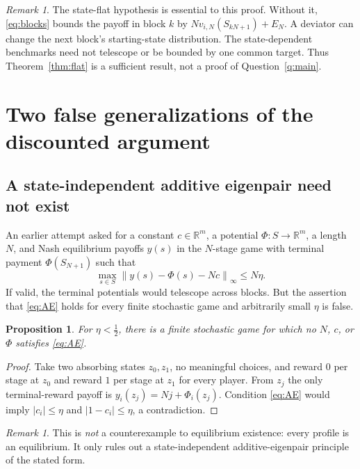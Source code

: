 \documentclass[11pt,a4paper]{article}
\numberwithin{equation}{section}
\newtheorem{proposition}[theorem]{Proposition}
\theoremstyle{definition}
\theoremstyle{remark}
\newtheorem{remark}[theorem]{Remark}
\newcommand{\norm}[1]{\left\lVert#1\right\rVert}
\begin{document}
\begin{remark}
The state-flat hypothesis is essential to this proof. Without it,
\eqref{eq:blocks} bounds the payoff in block $k$ by
$N v_{i,N}(S_{kN+1})+E_N$. A deviator can change the next block's
starting-state distribution. The state-dependent benchmarks need not
telescope or be bounded by one common target. Thus Theorem~\ref{thm:flat}
is a sufficient result, not a proof of Question~\ref{q:main}.
\end{remark}

\section{Two false generalizations of the discounted argument}
\subsection{A state-independent additive eigenpair need not exist}
An earlier attempt asked for a constant $c\in\mathbb R^m$, a potential
$\Phi:S\to\mathbb R^m$, a length $N$, and Nash equilibrium payoffs
$y(s)$ in the $N$-stage game with terminal payment $\Phi(S_{N+1})$ such that
\begin{equation}\label{eq:AE}
 \max_{s\in S}\norm{y(s)-\Phi(s)-Nc}_\infty\le N\eta.
\tag{AE}
\end{equation}
If valid, the terminal potentials would telescope across blocks. But the
assertion that \eqref{eq:AE} holds for every finite stochastic game and
arbitrarily small $\eta$ is false.

\begin{proposition}\label{prop:AEfalse}
For $\eta<\tfrac12$, there is a finite stochastic game for which no $N$,
$c$, or $\Phi$ satisfies \eqref{eq:AE}.
\end{proposition}
\begin{proof}
Take two absorbing states $z_0,z_1$, no meaningful choices, and reward $0$
per stage at $z_0$ and reward $1$ per stage at $z_1$ for every player.
From $z_j$ the only terminal-reward payoff is
$y_i(z_j)=Nj+\Phi_i(z_j)$. Condition \eqref{eq:AE} would imply
$|c_i|\le\eta$ and $|1-c_i|\le\eta$, a contradiction.
\end{proof}
\begin{remark}
This is \emph{not} a counterexample to equilibrium existence: every
profile is an equilibrium. It only rules out a state-independent
additive-eigenpair principle of the stated form.
\end{remark}
\end{document}
